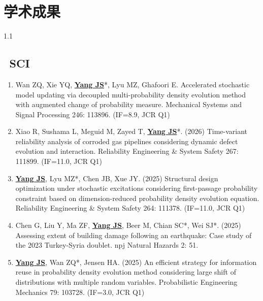 \documentclass{resume}
\begin{document}
\section{\faBook\;\; 学术成果}
\begin{spacing}{1.1}
\subsection{\faFileInvoice\,\; \textbf{SCI}} 
\begin{enumerate}[itemsep=5pt,topsep=2pt]
  \item Wan ZQ, Xie YQ, \underline{\textbf{Yang JS}}*, Lyu MZ, Ghafoori E. Accelerated stochastic model updating via decoupled multi-probability density evolution method with augmented change of probability measure. Mechanical Systems and Signal Processing 246: 113896. (IF=8.9, JCR Q1)

  \item Xiao R, Sushama L, Meguid M, Zayed T, \underline{\textbf{Yang JS}}*. (2026) Time-variant reliability analysis of corroded gas pipelines considering dynamic defect evolution and interaction. Reliability Engineering \& System Safety 267: 111899. (IF=11.0, JCR Q1)
  
  \item \underline{\textbf{Yang JS}}, Lyu MZ*, Chen JB, Xue JY. (2025) Structural design optimization under stochastic excitations considering first-passage probability constraint based on dimension-reduced probability density evolution equation. Reliability Engineering \& System Safety 264: 111378. (IF=11.0, JCR Q1)

   \item Chen G, Liu Y, Ma ZF, \underline{\textbf{Yang JS}}, Beer M, Chian SC*, Wei SJ*. (2025) Assessing extent of building damage following an earthquake: Case study of the 2023 Turkey-Syria doublet. npj Natural Hazards 2: 51.

  \item \underline{\textbf{Yang JS}}, Wan ZQ*, Jensen HA. (2025) An efficient strategy for information reuse in probability density evolution method considering large shift of distributions with multiple random variables. Probabilistic Engineering Mechanics 79: 103728. (IF=3.0, JCR Q1)


\end{enumerate}
\end{spacing}
\end{document}

